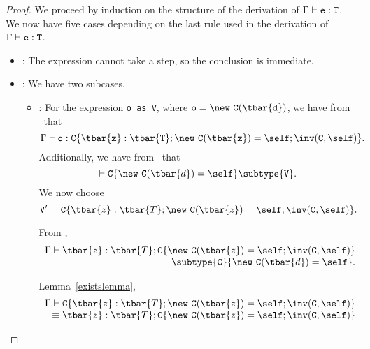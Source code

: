 \begin{proof}
We proceed by induction on the
structure of the derivation of $\Gamma \vdash {\tt e}: {\tt T}$.  We now have five
cases depending on the last rule used in the derivation
of $\Gamma \vdash {\tt e}: {\tt T}$.
\begin{itemize}
\item
\TVar: The expression cannot take a step, so the conclusion is immediate.
\item
\TCast: We have two subcases.
   \begin{itemize}
   \item
   \RCast:  For the expression {\tt o~as~V}, where 
            ${\tt o} = {\tt \new\ {\tt C(\tbar{d})}}$,
            we have from \TNew\ that 
            $$\Gamma \vdash {\tt o: {\tt C}\{\tbar{z}: \tbar{T}; \new\ {\tt C}(\tbar{z}) = \self; \inv({\tt C},\self)\}}.$$
            Additionally, we have from \RCast\ that 
            $$\vdash {\tt C}\{\new\ {\tt C}(\tbar{d}) = \self\} \subtype {\tt V}.$$
            We now choose 
            $${\tt V}' = {{\tt C}\{\tbar{z}: \tbar{T}; \new\ {\tt C}(\tbar{z}) = \self; \inv({\tt C},\self)\}}.$$


            From ,
            $$
            \begin{array}{r}
            \Gamma \vdash \tbar{z}: \tbar{T}; {{\tt C}\{\new\ {\tt C}(\tbar{z}) = \self; \inv({\tt C},\self)\}} \\
            \subtype {\tt C}\{\new\ {\tt C}(\tbar{d}) = \self\}.
            \end{array}
            $$

            Lemma~\ref{existslemma},
            $$
            \begin{array}{r}
            \Gamma \vdash {{\tt C}\{\tbar{z}: \tbar{T}; \new\ {\tt C}(\tbar{z}) = \self; \inv({\tt C},\self)\}} \\
            \equiv \tbar{z}: \tbar{T}; {{\tt C}\{\new\ {\tt C}(\tbar{z}) = \self; \inv({\tt C},\self)\}}
            \end{array}
            $$


\end{itemize}
\end{itemize}
\end{proof}
